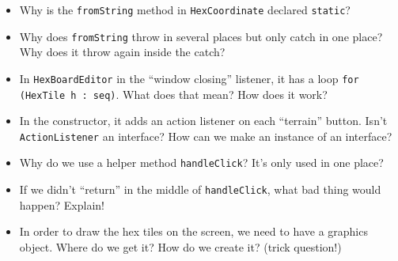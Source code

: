   \begin{itemize}
    \item Why is the \texttt{fromString} method in
      \texttt{HexCoordinate} declared \texttt{static}?
    \item Why does \texttt{fromString} throw in several places but
      only catch in one place?  Why does it throw again inside the
      catch?
    \item In \texttt{HexBoardEditor} in the ``window closing''
      listener, it has a loop \texttt{for (HexTile h : seq)}. What does
      that mean?  How does it work?
    \item In the constructor, it adds an action listener on each
      ``terrain'' button.  Isn't \texttt{ActionListener} an interface?
      How can we make an instance of an interface?
    \item Why do we use a helper method \texttt{handleClick}?
      It's only used in one place?
    \item If we didn't ``return'' in the middle of
      \texttt{handleClick}, what bad thing would happen?  Explain!
    \item In order to draw the hex tiles on the screen, we need to
      have a graphics object.  Where do we get it?  How do we create
      it?  (trick question!)
  \end{itemize}
